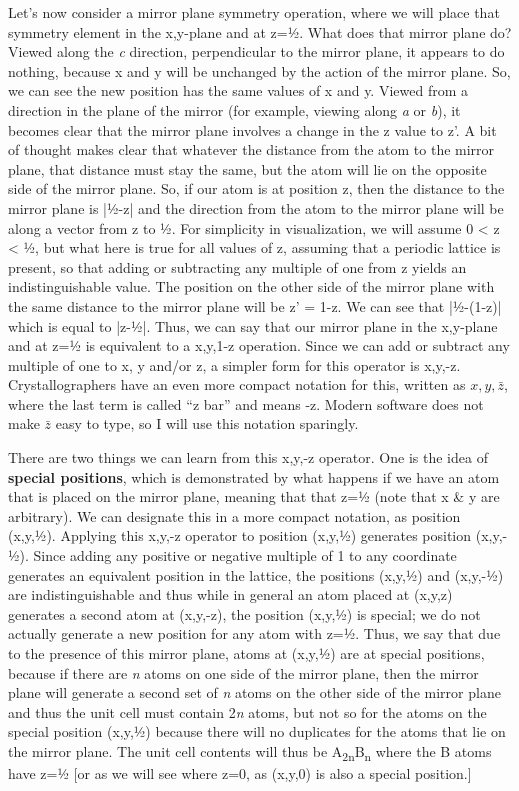Let’s now consider a mirror plane symmetry operation, where we will place that symmetry element in the x,y-plane and at z=½. What does that mirror plane do? Viewed along the \textit{c} direction, perpendicular to the mirror plane, it appears to do nothing, because x and y will be unchanged by the action of the mirror plane. So, we can see the new position has the same values of x and y. Viewed from a direction in the plane of the mirror (for example, viewing along \textit{a} or \textit{b}), it becomes clear that the mirror plane involves a change in the z value to z’. A bit of thought makes clear that whatever the distance from the atom to the mirror plane, that distance must stay the same, but the atom will lie on the opposite side of the mirror plane. So, if our atom is at position z, then the distance to the mirror plane is |½-z| and the direction from the atom to the mirror plane will be along a vector from z to ½. For simplicity in visualization, we will assume 0 < z < ½, but what here is true for all values of z, assuming that a periodic lattice is present, so that adding or subtracting any multiple of one from z yields an indistinguishable value. The position on the other side of the mirror plane with the same distance to the mirror plane will be z’ = 1-z. We can see that |½-(1-z)| which is equal to |z-½|. Thus, we can say that our mirror plane in the x,y-plane and at z=½ is equivalent to a x,y,1-z operation. Since we can add or subtract any multiple of one to x, y and/or z, a simpler form for this operator is x,y,-z. Crystallographers have an even more compact notation for this, written as $x,y,\bar{z}$, where the last term is called ``z bar'' and means -z. Modern software does not make $\bar{z}$ easy to type, so I will use this notation sparingly.

There are two things we can learn from this x,y,-z operator. One is the idea of \textbf{special positions}, which is demonstrated by what happens if we have an atom that is placed on the mirror plane, meaning that that z=½ (note that x \& y are arbitrary). We can designate this in a more compact notation, as position (x,y,½). Applying this x,y,-z operator to position (x,y,½) generates position (x,y,-½). Since adding any positive or negative multiple of 1 to any coordinate generates an equivalent position in the lattice, the positions (x,y,½) and (x,y,-½) are indistinguishable and thus while in general an atom placed at (x,y,z) generates a second atom at (x,y,-z), the position (x,y,½) is special; we do not actually generate a new position for any atom with z=½. Thus, we say that due to the presence of this mirror plane, atoms at (x,y,½) are at special positions, because if there are \textit{n} atoms on one side of the mirror plane, then the mirror plane will generate a second set of \textit{n} atoms on the other side of the mirror plane and thus the unit cell must contain 2\textit{n} atoms, but not so for the atoms on the special position (x,y,½) because there will no duplicates for the atoms that lie on the mirror plane. The unit cell contents will thus be A\textsubscript{2n}B\textsubscript{n} where the B atoms have z=½ [or as we will see where z=0, as (x,y,0) is also a special position.] 

